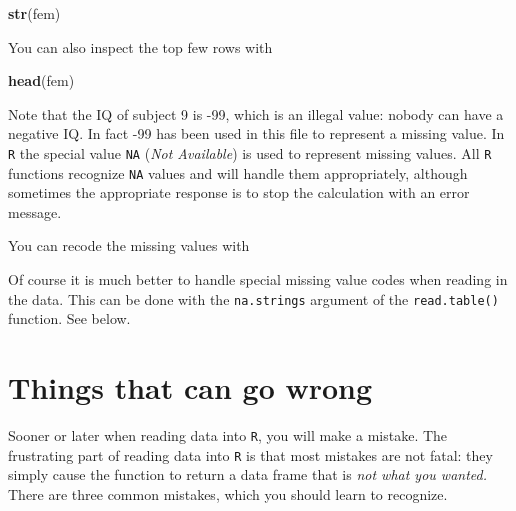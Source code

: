 \documentclass[
]{book}
\newenvironment{Shaded}{\begin{snugshade}}{\end{snugshade}}
\newcommand{\ConstantTok}[1]{\textcolor[rgb]{0.56,0.35,0.01}{#1}}
\newcommand{\DecValTok}[1]{\textcolor[rgb]{0.00,0.00,0.81}{#1}}
\newcommand{\FunctionTok}[1]{\textcolor[rgb]{0.13,0.29,0.53}{\textbf{#1}}}
\newcommand{\NormalTok}[1]{#1}
\newcommand{\OtherTok}[1]{\textcolor[rgb]{0.56,0.35,0.01}{#1}}
\newcommand{\SpecialCharTok}[1]{\textcolor[rgb]{0.81,0.36,0.00}{\textbf{#1}}}
\begin{document}
\begin{Shaded}
\begin{Highlighting}[]
\FunctionTok{str}\NormalTok{(fem)}
\end{Highlighting}
\end{Shaded}

You can also inspect the top few rows with

\begin{Shaded}
\begin{Highlighting}[]
\FunctionTok{head}\NormalTok{(fem)}
\end{Highlighting}
\end{Shaded}

Note that the IQ of subject 9 is -99, which is an illegal value:
nobody can have a negative IQ. In fact -99 has been used in this file
to represent a missing value. In \texttt{R} the special value
\texttt{NA} (\emph{Not Available}) is used to represent missing values. All
\texttt{R} functions recognize \texttt{NA} values and will handle them
appropriately, although sometimes the appropriate response is to stop
the calculation with an error message.

You can recode the missing values with

\begin{Shaded}
\end{Shaded}

Of course it is much better to handle special missing value codes
when reading in the data. This can be done with the
\texttt{na.strings} argument of the \texttt{read.table()}
function. See below.

\section{Things that can go wrong}\label{things-that-can-go-wrong}

Sooner or later when reading data into \texttt{R}, you will make a
mistake. The frustrating part of reading data into \texttt{R} is that
most mistakes are not fatal: they simply cause the function to return
a data frame that is \emph{not what you wanted.} There are three
common mistakes, which you should learn to recognize.
\end{document}
